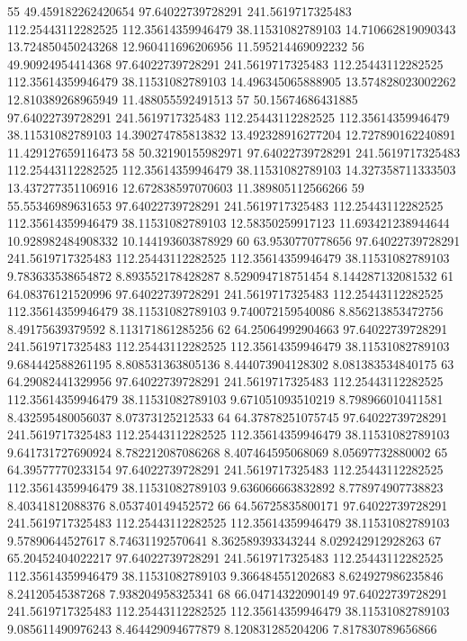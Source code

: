{55 49.459182262420654 97.64022739728291 241.5619717325483 112.25443112282525 112.35614359946479 38.11531082789103 14.710662819090343 13.724850450243268 12.960411696206956 11.595214469092232
56 49.90924954414368 97.64022739728291 241.5619717325483 112.25443112282525 112.35614359946479 38.11531082789103 14.496345065888905 13.574828023002262 12.810389268965949 11.488055592491513
57 50.15674686431885 97.64022739728291 241.5619717325483 112.25443112282525 112.35614359946479 38.11531082789103 14.390274785813832 13.492328916277204 12.727890162240891 11.429127659116473
58 50.32190155982971 97.64022739728291 241.5619717325483 112.25443112282525 112.35614359946479 38.11531082789103 14.327358711333503 13.437277351106916 12.672838597070603 11.389805112566266
59 55.55346989631653 97.64022739728291 241.5619717325483 112.25443112282525 112.35614359946479 38.11531082789103 12.58350259917123 11.693421238944644 10.928982484908332 10.144193603878929
60 63.9530770778656 97.64022739728291 241.5619717325483 112.25443112282525 112.35614359946479 38.11531082789103 9.783633538654872 8.893552178428287 8.529094718751454 8.144287132081532
61 64.08376121520996 97.64022739728291 241.5619717325483 112.25443112282525 112.35614359946479 38.11531082789103 9.740072159540086 8.856213853472756 8.49175639379592 8.113171861285256
62 64.25064992904663 97.64022739728291 241.5619717325483 112.25443112282525 112.35614359946479 38.11531082789103 9.684442588261195 8.808531363805136 8.444073904128302 8.081383534840175
63 64.29082441329956 97.64022739728291 241.5619717325483 112.25443112282525 112.35614359946479 38.11531082789103 9.671051093510219 8.798966010411581 8.432595480056037 8.07373125212533
64 64.37878251075745 97.64022739728291 241.5619717325483 112.25443112282525 112.35614359946479 38.11531082789103 9.641731727690924 8.782212087086268 8.407464595068069 8.05697732880002
65 64.39577770233154 97.64022739728291 241.5619717325483 112.25443112282525 112.35614359946479 38.11531082789103 9.636066663832892 8.778974907738823 8.40341812088376 8.053740149452572
66 64.56725835800171 97.64022739728291 241.5619717325483 112.25443112282525 112.35614359946479 38.11531082789103 9.57890644527617 8.74631192570641 8.362589393343244 8.029242912928263
67 65.20452404022217 97.64022739728291 241.5619717325483 112.25443112282525 112.35614359946479 38.11531082789103 9.366484551202683 8.624927986235846 8.24120545387268 7.938204958325341
68 66.04714322090149 97.64022739728291 241.5619717325483 112.25443112282525 112.35614359946479 38.11531082789103 9.085611490976243 8.464429094677879 8.120831285204206 7.817830789656866
}
